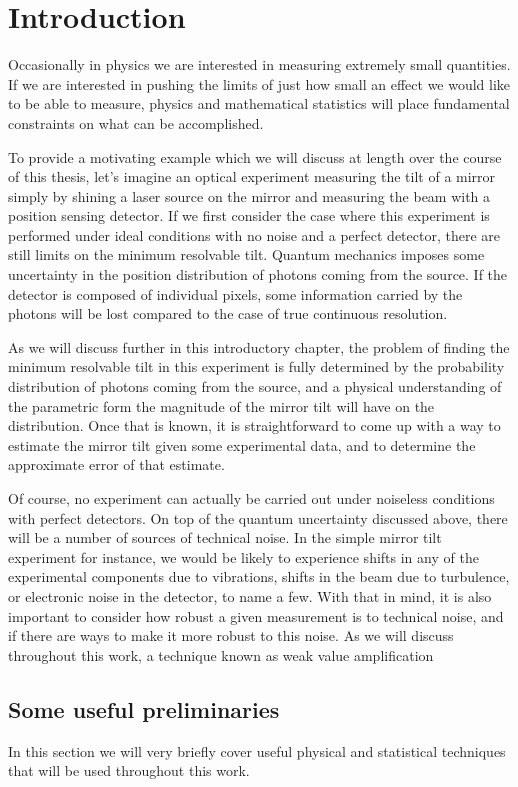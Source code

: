 \chapter{Introduction}
Occasionally in physics we are interested in measuring extremely small quantities.  If we are interested in pushing the limits of just how small an effect we would like to be able to measure, physics and mathematical statistics will place fundamental constraints on what can be accomplished.

To provide a motivating example which we will discuss at length over the course of this thesis, let's imagine an optical experiment measuring the tilt of a mirror simply by shining a laser source on the mirror and measuring the beam with a position sensing detector.  If we first consider the case where this experiment is performed under ideal conditions with no noise and a perfect detector, there are still limits on the minimum resolvable tilt.  Quantum mechanics imposes some uncertainty in the position distribution of photons coming from the source.  If the detector is composed of individual pixels, some information carried by the photons will be lost compared to the case of true continuous resolution.

As we will discuss further in this introductory chapter, the problem of finding the minimum resolvable tilt in this experiment is fully determined by the probability distribution of photons coming from the source, and a physical understanding of the parametric form the magnitude of the mirror tilt will have on the distribution.  Once that is known, it is straightforward to come up with a way to estimate the mirror tilt given some experimental data, and to determine the approximate error of that estimate.

Of course, no experiment can actually be carried out under noiseless conditions with perfect detectors.  On top of the quantum uncertainty discussed above, there will be a number of sources of technical noise.  In the simple mirror tilt experiment for instance, we would be likely to experience shifts in any of the experimental components due to vibrations, shifts in the beam due to turbulence, or electronic noise in the detector, to name a few.  With that in mind, it is also important to consider how robust a given measurement is to technical noise, and if there are ways to make it more robust to this noise.  As we will discuss throughout this work, a technique known as weak value amplification 


\section{Some useful preliminaries}
In this section we will very briefly cover useful physical and statistical techniques that will be used throughout this work.
